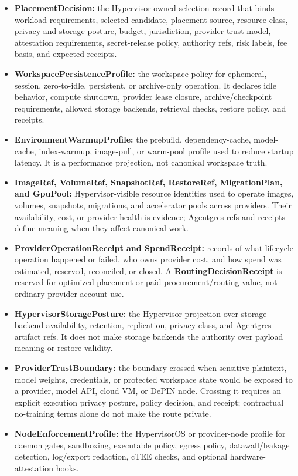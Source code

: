 \documentclass[
  11pt,
]{article}
\begin{document}
\begin{itemize}
  proof, or restore truth.
\item
  \textbf{PlacementDecision:} the Hypervisor-owned selection record that
  binds workload requirements, selected candidate, placement source,
  resource class, privacy and storage posture, budget, jurisdiction,
  provider-trust model, attestation requirements, secret-release policy,
  authority refs, risk labels, fee basis, and expected receipts.
\item
  \textbf{WorkspacePersistenceProfile:} the workspace policy for
  ephemeral, session, zero-to-idle, persistent, or archive-only
  operation. It declares idle behavior, compute shutdown, provider lease
  closure, archive/checkpoint requirements, allowed storage backends,
  retrieval checks, restore policy, and receipts.
\item
  \textbf{EnvironmentWarmupProfile:} the prebuild, dependency-cache,
  model-cache, index-warmup, image-pull, or warm-pool profile used to
  reduce startup latency. It is a performance projection, not canonical
  workspace truth.
\item
  \textbf{ImageRef, VolumeRef, SnapshotRef, RestoreRef, MigrationPlan,
  and GpuPool:}
  Hypervisor-visible resource identities used to operate images,
  volumes, snapshots, migrations, and accelerator pools across providers.
  Their availability, cost, or provider health is evidence; Agentgres
  refs and receipts define meaning when they affect canonical work.
\item
  \textbf{ProviderOperationReceipt and SpendReceipt:} records of what
  lifecycle operation happened or failed, who owns provider cost, and how
  spend was estimated, reserved, reconciled, or closed. A
  \textbf{RoutingDecisionReceipt} is reserved for optimized placement or
  paid procurement/routing value, not ordinary provider-account use.
\item
  \textbf{HypervisorStoragePosture:} the Hypervisor projection over
  storage-backend availability, retention, replication, privacy class,
  and Agentgres artifact refs. It does not make storage backends the
  authority over payload meaning or restore validity.
\item
  \textbf{ProviderTrustBoundary:} the boundary crossed when sensitive
  plaintext, model weights, credentials, or protected workspace state
  would be exposed to a provider, model API, cloud VM, or DePIN node.
  Crossing it requires an explicit execution privacy posture, policy
  decision, and receipt; contractual no-training terms alone do not make
  the route private.
\item
  \textbf{NodeEnforcementProfile:} the HypervisorOS or provider-node
  profile for daemon gates, sandboxing, executable policy, egress
  policy, datawall/leakage detection, log/export redaction, cTEE checks,
  and optional hardware-attestation hooks.
\end{itemize}
\end{document}
